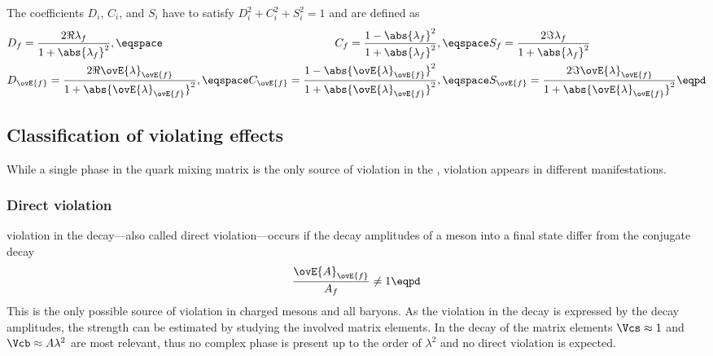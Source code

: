 The \CP coefficients $D_i$, $C_i$, and $S_i$ have to satisfy $D_i^2 + C_i^2 +
S_i^2 = 1$ and are defined as
%
\begin{equation}\label{eq:cpv_theory:flavour_physics:time_evolution:cp_coefficients}
  \begin{alignedat}{2}
    &D_f = \frac{2 \Re \lambda_f}{1+\abs{\lambda_f}^2}, \eqspace 
    &C_f = \frac{1 - \abs{\lambda_f}^2}{1 + \abs{\lambda_f}^2}, \eqspace 
    &S_f = \frac{2 \Im \lambda_f}{1+\abs{\lambda_f}^2} \\
    &D_{\ovE{f}} = \frac{2 \Re \ovE{\lambda}_{\ovE{f}}}{1+\abs{\ovE{\lambda}_{\ovE{f}}}^2}, \eqspace 
    &C_{\ovE{f}} = \frac{1 - \abs{\ovE{\lambda}_{\ovE{f}}}^2}{1 + \abs{\ovE{\lambda}_{\ovE{f}}}^2}, \eqspace 
    &S_{\ovE{f}} = \frac{2 \Im \ovE{\lambda}_{\ovE{f}}}{1+\abs{\ovE{\lambda}_{\ovE{f}}}^2}\eqpd \\
  \end{alignedat}
\end{equation}
%

\subsection[Classification of \CP violating effects]{Classification of \CPbfsf violating effects}
\label{sec:cpv_theory:flavour_physics:cpv_classification}

While a single phase in the \CKM quark mixing matrix is the only source of \CP
violation in the \SM, \CP violation appears in different manifestations.

\subsubsection[Direct \CP violation]{Direct \CPbfsf violation}
\label{sec:cpv_theory:flavour_physics:cpv_classification:direct}

\CP violation in the decay---also called direct \CP violation---occurs if the
decay amplitudes of a meson into a final state differ from the \CP conjugate
decay
%
\begin{equation}
  \frac{\ovE{A}_{\ovE{f}}}{A_f} \neq 1 \eqpd
\end{equation}
%
This is the only possible source of \CP violation in charged mesons and all
baryons. As the \CP violation in the decay is expressed by the decay amplitudes,
the strength can be estimated by studying the involved \CKM matrix elements. In
the decay of \BdToJpsiKS the matrix elements $\Vcs \approx 1$ and $\Vcb
\approx A\lambda^2$ are most relevant, thus no complex phase is present up to
the order of $\lambda^2$ and no direct \CP violation is expected.

